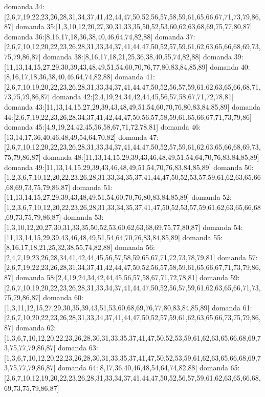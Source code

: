 domanda 34:[2,6,7,19,22,23,26,28,31,34,37,41,42,44,47,50,52,56,57,58,59,61,65,66,67,71,73,79,86,87]
domanda 35:[1,3,10,12,20,27,30,31,33,35,50,52,53,60,62,63,68,69,75,77,80,87]
domanda 36:[8,16,17,18,36,38,40,46,64,74,82,88]
domanda 37:[2,6,7,10,12,20,22,23,26,28,31,33,34,37,41,44,47,50,52,57,59,61,62,63,65,66,68,69,73,75,79,86,87]
domanda 38:[8,16,17,18,21,25,36,38,40,55,74,82,88]
domanda 39:[11,13,14,15,27,29,30,39,43,48,49,51,54,60,70,76,77,80,83,84,85,89]
domanda 40:[8,16,17,18,36,38,40,46,64,74,82,88]
domanda 41:[2,6,7,10,19,20,22,23,26,28,31,33,34,37,41,44,47,50,52,56,57,59,61,62,63,65,66,68,71,73,75,79,86,87]
domanda 42:[2,4,19,24,34,42,44,45,56,57,58,67,71,72,78,81]
domanda 43:[11,13,14,15,27,29,39,43,48,49,51,54,60,70,76,80,83,84,85,89]
domanda 44:[2,6,7,19,22,23,26,28,34,37,41,42,44,47,50,56,57,58,59,61,65,66,67,71,73,79,86]
domanda 45:[4,9,19,24,42,45,56,58,67,71,72,78,81]
domanda 46:[13,14,17,36,40,46,48,49,54,64,70,82]
domanda 47:[2,6,7,10,12,20,22,23,26,28,31,33,34,37,41,44,47,50,52,57,59,61,62,63,65,66,68,69,73,75,79,86,87]
domanda 48:[11,13,14,15,29,39,43,46,48,49,51,54,64,70,76,83,84,85,89]
domanda 49:[11,13,14,15,29,39,43,46,48,49,51,54,70,76,83,84,85,89]
domanda 50:[1,2,3,6,7,10,12,20,22,23,26,28,31,33,34,35,37,41,44,47,50,52,53,57,59,61,62,63,65,66,68,69,73,75,79,86,87]
domanda 51:[11,13,14,15,27,29,39,43,48,49,51,54,60,70,76,80,83,84,85,89]
domanda 52:[1,2,3,6,7,10,12,20,22,23,26,28,31,33,34,35,37,41,47,50,52,53,57,59,61,62,63,65,66,68,69,73,75,79,86,87]
domanda 53:[1,3,10,12,20,27,30,31,33,35,50,52,53,60,62,63,68,69,75,77,80,87]
domanda 54:[11,13,14,15,29,39,43,46,48,49,51,54,64,70,76,83,84,85,89]
domanda 55:[8,16,17,18,21,25,32,38,55,74,82,88]
domanda 56:[2,4,7,19,23,26,28,34,41,42,44,45,56,57,58,59,65,67,71,72,73,78,79,81]
domanda 57:[2,6,7,19,22,23,26,28,31,34,37,41,42,44,47,50,52,56,57,58,59,61,65,66,67,71,73,79,86,87]
domanda 58:[2,4,19,24,34,42,44,45,56,57,58,67,71,72,78,81]
domanda 59:[2,6,7,10,19,20,22,23,26,28,31,33,34,37,41,44,47,50,52,56,57,59,61,62,63,65,66,71,73,75,79,86,87]
domanda 60:[1,3,11,12,15,27,29,30,35,39,43,51,53,60,68,69,76,77,80,83,84,85,89]
domanda 61:[2,6,7,10,20,22,23,26,28,31,33,34,37,41,44,47,50,52,57,59,61,62,63,65,66,73,75,79,86,87]
domanda 62:[1,3,6,7,10,12,20,22,23,26,28,30,31,33,35,37,41,47,50,52,53,59,61,62,63,65,66,68,69,73,75,77,79,86,87]
domanda 63:[1,3,6,7,10,12,20,22,23,26,28,30,31,33,35,37,41,47,50,52,53,59,61,62,63,65,66,68,69,73,75,77,79,86,87]
domanda 64:[8,17,36,40,46,48,54,64,74,82,88]
domanda 65:[2,6,7,10,12,19,20,22,23,26,28,31,33,34,37,41,44,47,50,52,56,57,59,61,62,63,65,66,68,69,73,75,79,86,87]
